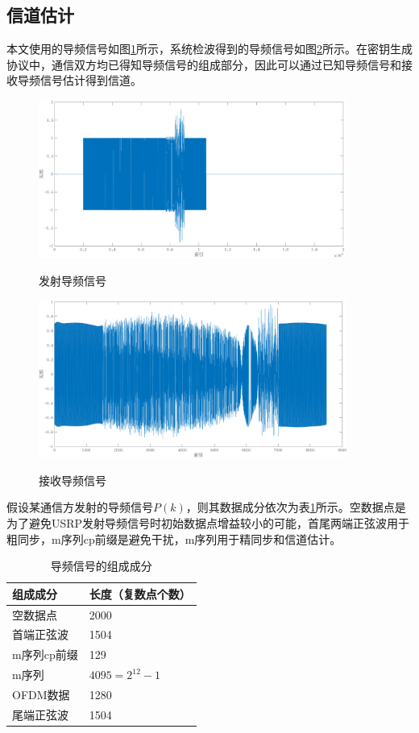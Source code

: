 \documentclass[master]{seuthesis} %
\begin{document}
\begin{Main}
\section{信道估计}

本文使用的导频信号如图\ref{tx_pilot}所示，系统检波得到的导频信号如图\ref{rx_pilot}所示。在密钥生成协议中，通信双方均已得知导频信号的组成部分，因此可以通过已知导频信号和接收导频信号估计得到信道。

\begin{figure}
    \centering
    \includegraphics[width=0.9\textwidth]{images/tx_pilot}
    \caption{发射导频信号}{} 
    \label{tx_pilot}
\end{figure}

\begin{figure}
    \centering
    \includegraphics[width=0.9\textwidth]{images/rx_pilot}
    \caption{接收导频信号}{} 
    \label{rx_pilot}
\end{figure}

假设某通信方发射的导频信号$P(k)$，则其数据成分依次为表\ref{component_of_pilot}所示。空数据点是为了避免USRP发射导频信号时初始数据点增益较小的可能，首尾两端正弦波用于粗同步，m序列cp前缀是避免干扰，m序列用于精同步和信道估计。

\begin{table}[]
    \centering
    \begin{tabular}{|l|l|}
    \hline
    组成成分 & 长度（复数点个数）\\ \hline
    空数据点 & 2000 \\ \hline
    首端正弦波 & 1504 \\ \hline
    m序列cp前缀 & 129 \\ \hline
    m序列 & $ 4095 = 2^{12} - 1 $ \\ \hline
    OFDM数据 & 1280 \\ \hline
    尾端正弦波 & 1504 \\ \hline
    \end{tabular}
    \caption{导频信号的组成成分
    \label{component_of_pilot}}
\end{table}


\end{Main}
\end{document}
